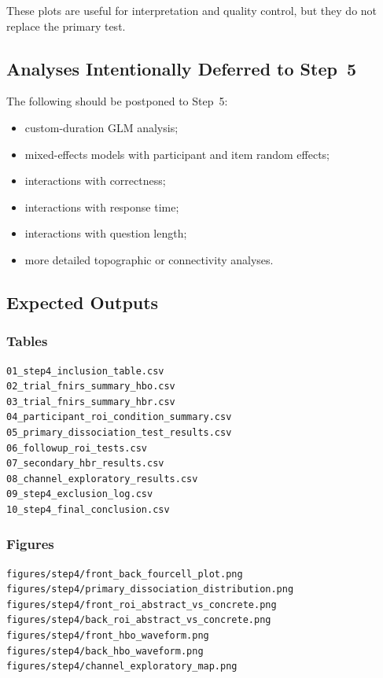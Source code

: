 These plots are useful for interpretation and quality control, but they do not replace the primary test.

\subsection{Analyses Intentionally Deferred to Step~5}
The following should be postponed to Step~5:
\begin{itemize}
    \item custom-duration GLM analysis;
    \item mixed-effects models with participant and item random effects;
    \item interactions with correctness;
    \item interactions with response time;
    \item interactions with question length;
    \item more detailed topographic or connectivity analyses.
\end{itemize}

\subsection{Expected Outputs}

\subsubsection*{Tables}
\begin{verbatim}
01_step4_inclusion_table.csv
02_trial_fnirs_summary_hbo.csv
03_trial_fnirs_summary_hbr.csv
04_participant_roi_condition_summary.csv
05_primary_dissociation_test_results.csv
06_followup_roi_tests.csv
07_secondary_hbr_results.csv
08_channel_exploratory_results.csv
09_step4_exclusion_log.csv
10_step4_final_conclusion.csv
\end{verbatim}

\subsubsection*{Figures}
\begin{verbatim}
figures/step4/front_back_fourcell_plot.png
figures/step4/primary_dissociation_distribution.png
figures/step4/front_roi_abstract_vs_concrete.png
figures/step4/back_roi_abstract_vs_concrete.png
figures/step4/front_hbo_waveform.png
figures/step4/back_hbo_waveform.png
figures/step4/channel_exploratory_map.png
\end{verbatim}

